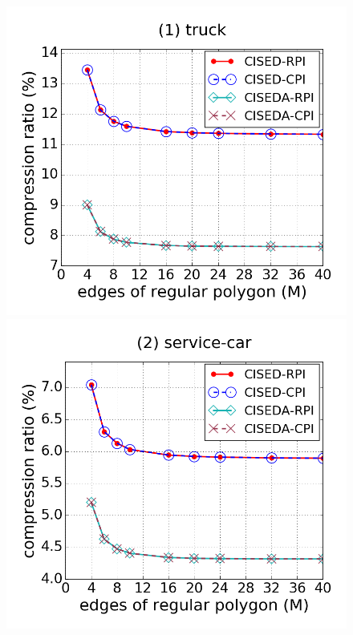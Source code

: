 \begin{figure}[tb!]
\centering
\includegraphics[scale = 0.245]{figures/Exp-M-e-200-CR-truck.png}
\includegraphics[scale = 0.245]{figures/Exp-M-e-200-CR-service.png}

\end{figure}
